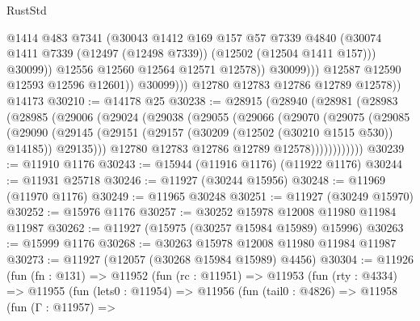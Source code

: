 \begin{lexlean}{RustStd}
\begin{coremodule}
                              @1414
                              @483
                              @7341
                              (@30043
                                @1412
                                @169
                                @157
                                @57
                                @7339
                                @4840
                                (@30074
                                  @1411
                                  @7339
                                  (@12497 (@12498 @7339))
                                  (@12502 (@12504 @1411 @157)))
                                @30099))
                            @12556
                            @12560
                            @12564
                            @12571
                            @12578))
                        @30099)))
                  @12587
                  @12590
                  @12593
                  @12596
                  @12601))
              @30099)))
        @12780
        @12783
        @12786
        @12789
        @12578))
    @14173
@30210 := @14178 @25
@30238 := @28915
    (@28940
      (@28981
        (@28983
          (@28985
            (@29006
              (@29024
                (@29038
                  (@29055
                    (@29066
                      (@29070
                        (@29075
                          (@29085
                            (@29090
                              (@29145
                                (@29151
                                  (@29157 (@30209 (@12502 (@30210 @1515 @530)) @14185))
                                  @29135)))
                            @12780
                            @12783
                            @12786
                            @12789
                            @12578))))))))))))
@30239 := @11910 @1176
@30243 := @15944 (@11916 @1176) (@11922 @1176)
@30244 := @11931 @25718
@30246 := @11927 (@30244 @15956)
@30248 := @11969 (@11970 @1176)
@30249 := @11965 @30248
@30251 := @11927 (@30249 @15970)
@30252 := @15976 @1176
@30257 := @30252 @15978 @12008 @11980 @11984 @11987
@30262 := @11927 (@15975 (@30257 @15984 @15989) @15996)
@30263 := @15999 @1176
@30268 := @30263 @15978 @12008 @11980 @11984 @11987
@30273 := @11927 (@12057 (@30268 @15984 @15989) @4456)
@30304 := @11926
    (fun (fn : @131) =>
    @11952
      (fun (rc : @11951) =>
      @11953
        (fun (rty : @4334) =>
        @11955
          (fun (lets0 : @11954) =>
          @11956
            (fun (tail0 : @4826) =>
            @11958
              (fun (Γ : @11957) =>

\end{coremodule}
\end{lexlean}
